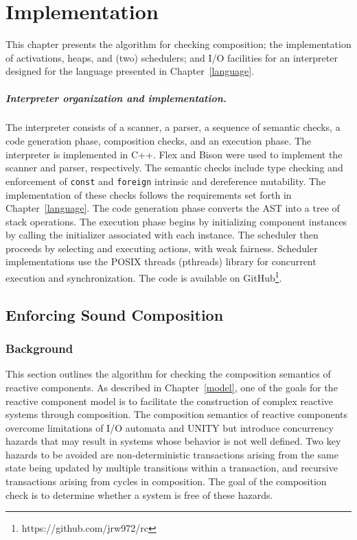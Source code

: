 \chapter{Implementation}
\label{implementation}

This chapter presents the algorithm for checking composition; the implementation of activations, heaps, and (two) schedulers; and I/O facilities for an interpreter designed for the language presented in Chapter~\ref{language}.

\paragraph{Interpreter organization and implementation.}
The interpreter consists of a scanner, a parser, a sequence of semantic checks, a code generation phase, composition checks, and an execution phase.
The interpreter is implemented in C++.
Flex and Bison were used to implement the scanner and parser, respectively.
The semantic checks include type checking and enforcement of \verb+const+ and \verb+foreign+ intrinsic and dereference mutability.
The implementation of these checks follows the requirements set forth in Chapter~\ref{language}.
The code generation phase converts the AST into a tree of stack operations.
The execution phase begins by initializing component instances by calling the initializer associated with each instance.
The scheduler then proceeds by selecting and executing actions, with weak fairness.
Scheduler implementations use the POSIX threads (pthreads) library for concurrent execution and synchronization.
The code is available on GitHub\footnote{https://github.com/jrw972/rc}.

\section{Enforcing Sound Composition}
\label{sound_composition}

\subsection{Background}

This section outlines the algorithm for checking the composition semantics of reactive components.
As described in Chapter~\ref{model}, one of the goals for the reactive component model is to facilitate the construction of complex reactive systems through composition.
The composition semantics of reactive components overcome limitations of I/O automata and UNITY but introduce concurrency hazards that may result in systems whose behavior is not well defined.
Two key hazards to be avoided are non-deterministic transactions arising from the same state being updated by multiple transitions within a transaction, and recursive transactions arising from cycles in composition.
The goal of the composition check is to determine whether a system is free of these hazards.

